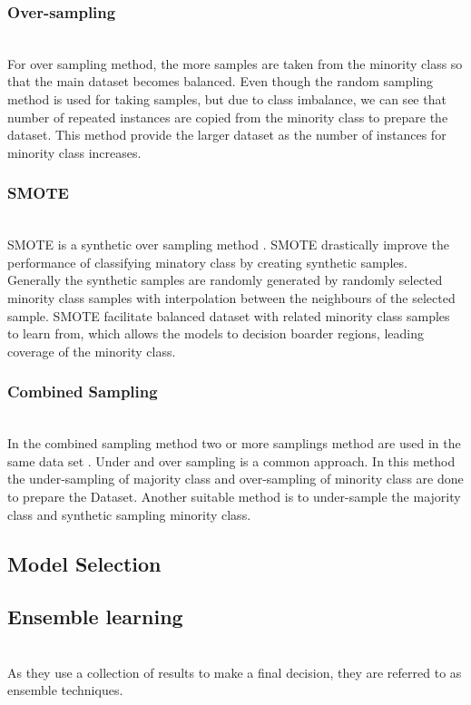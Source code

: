 \subsubsection{Over-sampling}\hspace*{\fill} \\
For over sampling method, the more samples are taken from the minority class so that the main dataset becomes balanced. Even though the random sampling method is used for taking samples, but due to class imbalance, we can see that number of repeated instances are copied from the minority class to prepare the dataset. This method provide the larger dataset as the number of instances for minority class increases. 

\subsubsection{SMOTE}\hspace*{\fill} \\
SMOTE is a synthetic over sampling method \cite{2002}. SMOTE drastically improve the performance of classifying minatory class by creating synthetic samples. Generally the synthetic samples are randomly generated by randomly selected minority class samples with interpolation between the neighbours of the selected sample. SMOTE facilitate balanced dataset with related minority class samples to learn from, which allows the models to decision boarder regions,  leading coverage of the minority class.

\subsubsection{Combined Sampling}\hspace*{\fill} \\
In the combined sampling method two or more samplings method are used in the same data set \cite{10.1145/3055635.3056643}. Under and over sampling is a common approach. In this method the under-sampling of majority class and over-sampling of minority class are done to prepare the Dataset. Another suitable method is to under-sample the majority class and synthetic sampling minority class. 

\subsection{Model Selection}\label{subsec:model-selection}

\subsection{Ensemble learning}\label{subsec:ensemble-learning}\hspace*{\fill} \\
As they use a collection of results to make a final decision, they are referred to as ensemble techniques.

